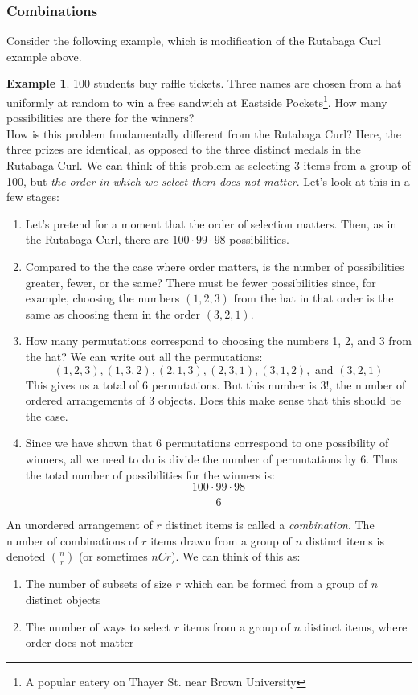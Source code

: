\documentclass[12pt]{article}
\theoremstyle{definition}
\newtheorem*{example}{Example}
\theoremstyle{remark}
\begin{document}
\subsubsection{Combinations}
Consider the following example, which is modification of the Rutabaga Curl example above.

\begin{example}100 students buy raffle tickets. Three names are chosen from a hat uniformly at random to win a free sandwich at Eastside Pockets\footnote{A popular eatery on Thayer St. near Brown University}. How many possibilities are there for the winners?\\

How is this problem fundamentally different from the Rutabaga Curl? Here, the three prizes are identical, as opposed to the three distinct medals in the Rutabaga Curl. We can think of this problem as selecting 3 items from a group of 100, but \emph{the order in which we select them does not matter}. Let's look at this in a few stages:
\begin{enumerate}
\item Let's pretend for a moment that the order of selection matters. Then, as in the Rutabaga Curl, there are $100 \cdot 99 \cdot 98$ possibilities.
\item Compared to the the case where order matters, is the number of possibilities greater, fewer, or the same? There must be fewer possibilities since, for example, choosing the numbers $(1, 2, 3)$ from the hat in that order is the same as choosing them in the order $(3, 2, 1)$.
\item How many permutations correspond to choosing the numbers 1, 2, and 3 from the hat? We can write out all the permutations:
\[
(1, 2, 3), (1, 3, 2), (2, 1, 3), (2, 3, 1), (3, 1, 2), \text{ and } (3, 2, 1)
\]
This gives us a total of 6 permutations. But this number is $3!$, the number of ordered arrangements of 3 objects. Does this make sense that this should be the case.
\item Since we have shown that 6 permutations correspond to one possibility of winners, all we need to do is divide the number of permutations by 6. Thus the total number of possibilities for the winners is:
\[
\frac{100 \cdot 99 \cdot 98}{6}
\]
\end{enumerate}
\end{example}

\begin{framed}
An unordered arrangement of $r$ distinct items is called a \emph{combination}. The number of combinations of $r$ items drawn from a group of $n$ distinct items is denoted $\binom{n}{r}$ (or sometimes $nCr$). We can think of this as:
\begin{enumerate}
\item The number of subsets of size $r$ which can be formed from a group of $n$ distinct objects
\item The number of ways to select $r$ items from a group of $n$ distinct items, where order does not matter
\end{enumerate}
\end{framed}
\end{document}
